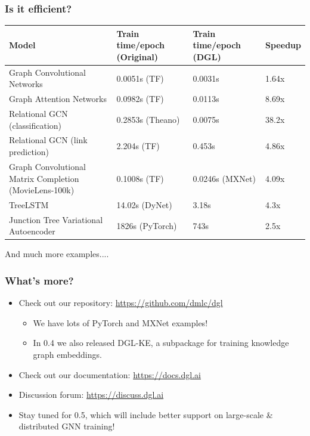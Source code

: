 \documentclass[10pt,aspectratio=169]{beamer}
\begin{document}
	\begin{frame}
		\frametitle{Is it efficient?}
		\begin{center}
			\centering
			\begin{tabular}{|p{}p{0.2\textwidth}p{}p{}|}
				\hline
				Model & Train time/epoch (Original) & Train time/epoch (DGL) & Speedup \\
				\hline
				Graph Convolutional Networks & 0.0051s (TF) & 0.0031s & 1.64x \\
				\hline
				Graph Attention Networks & 0.0982s (TF) & 0.0113s & 8.69x \\
				\hline
				Relational GCN (classification) & 0.2853s (Theano) & 0.0075s & 38.2x \\
				\hline
				Relational GCN (link prediction) & 2.204s (TF) & 0.453s & 4.86x \\
				\hline
				Graph Convolutional Matrix Completion (MovieLens-100k) & 0.1008s (TF) & 0.0246s (MXNet) & 4.09x \\
				\hline
				TreeLSTM & 14.02s (DyNet) & 3.18s & 4.3x \\
				\hline
				Junction Tree Variational Autoencoder & 1826s (PyTorch) & 743s & 2.5x \\
				\hline
			\end{tabular}
			And much more examples....
		\end{center}
	\end{frame}

	\begin{frame}
		\frametitle{What's more?}
		\begin{itemize}
			\item Check out our repository: \url{https://github.com/dmlc/dgl}
			\begin{itemize}
				\item We have lots of PyTorch and MXNet examples!
				\item In 0.4 we also released DGL-KE, a subpackage for training knowledge graph embeddings.
			\end{itemize}
			\item Check out our documentation: \url{https://docs.dgl.ai}
			\item Discussion forum: \url{https://discuss.dgl.ai}
			\item Stay tuned for 0.5, which will include better support on large-scale \& distributed GNN training!
		\end{itemize}
	\end{frame}
\end{document}
